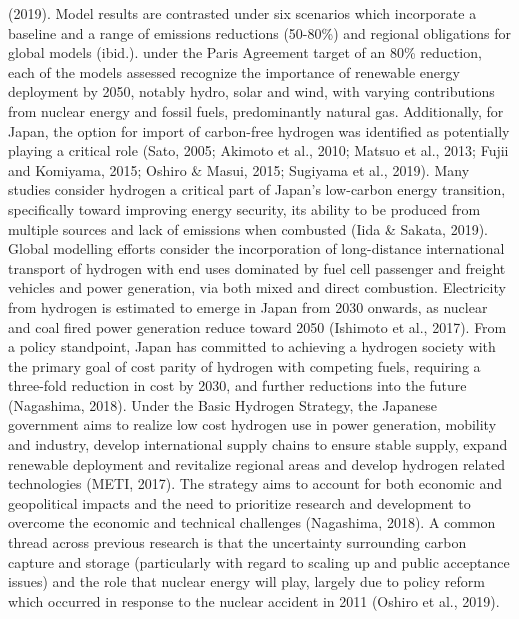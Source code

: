 (2019). Model results are contrasted under six scenarios which incorporate a baseline and a range of emissions reductions (50-80\%) and regional obligations for global models (ibid.). under the Paris Agreement target of an 80\% reduction, each of the models assessed recognize the importance of renewable energy deployment by 2050, notably hydro, solar and wind, with varying contributions from nuclear energy and fossil fuels, predominantly natural gas. Additionally, for Japan, the option for import of carbon-free hydrogen was identified as potentially playing a critical role (Sato, 2005; Akimoto et al., 2010; Matsuo et al., 2013; Fujii and Komiyama, 2015; Oshiro \& Masui, 2015; Sugiyama et al., 2019). Many studies consider hydrogen a critical part of Japan's low-carbon energy transition, specifically toward improving energy security, its ability to be produced from multiple sources and lack of emissions when combusted (Iida \& Sakata, 2019). Global modelling efforts consider the incorporation of long-distance international transport of hydrogen with end uses dominated by fuel cell passenger and freight vehicles and power generation, via both mixed and direct combustion. Electricity from hydrogen is estimated to emerge in Japan from 2030 onwards, as nuclear and coal fired power generation reduce toward 2050 (Ishimoto et al., 2017). From a policy standpoint, Japan has committed to achieving a hydrogen society with the primary goal of cost parity of hydrogen with competing fuels, requiring a three-fold reduction in cost by 2030, and further reductions into the future (Nagashima, 2018). Under the Basic Hydrogen Strategy, the Japanese government aims to realize low cost hydrogen use in power generation, mobility and industry, develop international supply chains to ensure stable supply, expand renewable deployment and revitalize regional areas and develop hydrogen related technologies (METI, 2017). The strategy aims to account for both economic and geopolitical impacts and the need to prioritize research and development to overcome the economic and technical challenges (Nagashima, 2018). A common thread across previous research is that the uncertainty surrounding carbon capture and storage (particularly with regard to scaling up and public acceptance issues) and the role that nuclear energy will play, largely due to policy reform which occurred in response to the nuclear accident in 2011 (Oshiro et al., 2019).

